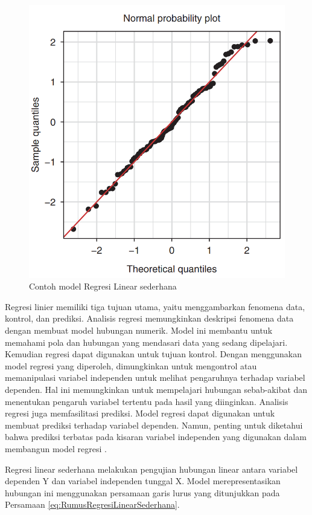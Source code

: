 \begin{figure}[H]
  \centering
  \includegraphics[scale=0.43]{gambar/plotregresilinear.png}
  \caption{Contoh model Regresi Linear sederhana \parencite{Rivera}}
  \label{fig:plotregresilinear}
\end{figure}

Regresi linier memiliki tiga tujuan utama, yaitu menggambarkan fenomena data, kontrol, dan prediksi. Analisis regresi memungkinkan deskripsi fenomena data dengan membuat model hubungan numerik. Model ini membantu untuk memahami pola dan hubungan yang mendasari data yang sedang dipelajari. Kemudian regresi dapat digunakan untuk tujuan kontrol. Dengan menggunakan model regresi yang diperoleh, dimungkinkan untuk mengontrol atau memanipulasi variabel independen untuk melihat pengaruhnya terhadap variabel dependen. Hal ini memungkinkan untuk mempelajari hubungan sebab-akibat dan menentukan pengaruh variabel tertentu pada hasil yang diinginkan. Analisis regresi juga memfasilitasi prediksi. Model regresi dapat digunakan untuk membuat prediksi terhadap variabel dependen. Namun, penting untuk diketahui bahwa prediksi terbatas pada kisaran variabel independen yang digunakan dalam membangun model regresi \parencite{Sulardi}.

Regresi linear sederhana melakukan pengujian hubungan linear antara variabel dependen Y dan variabel independen tunggal X. Model merepresentasikan hubungan ini menggunakan persamaan garis lurus yang ditunjukkan pada Persamaan \ref{eq:RumusRegresiLinearSederhana}.

